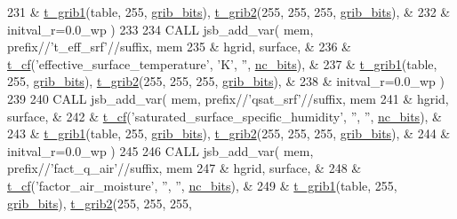 \begin{DoxyCode}
231       & \hyperlink{structmo__jsb__io_1_1t__grib1}{t\_grib1}(table, 255, \hyperlink{namespacemo__jsb__io_aade09fd070010f905e77497f041ce6c3}{grib\_bits}), \hyperlink{structmo__jsb__io_1_1t__grib2}{t\_grib2}(255, 255, 255, 
      \hyperlink{namespacemo__jsb__io_aade09fd070010f905e77497f041ce6c3}{grib\_bits}),   &
232       & initval\_r=0.0\_wp )
233 
234     \textcolor{keyword}{CALL }jsb\_add\_var( mem, prefix//\textcolor{stringliteral}{'t\_eff\_srf'}//suffix, mem%
235       & hgrid, surface,                                                      &
236       & \hyperlink{structmo__jsb__io_1_1t__cf}{t\_cf}(\textcolor{stringliteral}{'effective\_surface\_temperature'}, \textcolor{stringliteral}{'K'}, \textcolor{stringliteral}{''}, \hyperlink{namespacemo__jsb__io_a4bf2b656fa0a7acf938f0bfcad5870e3}{nc\_bits}),                &
237       & \hyperlink{structmo__jsb__io_1_1t__grib1}{t\_grib1}(table, 255, \hyperlink{namespacemo__jsb__io_aade09fd070010f905e77497f041ce6c3}{grib\_bits}), \hyperlink{structmo__jsb__io_1_1t__grib2}{t\_grib2}(255, 255, 255, 
      \hyperlink{namespacemo__jsb__io_aade09fd070010f905e77497f041ce6c3}{grib\_bits}),   &
238       & initval\_r=0.0\_wp )
239 
240     \textcolor{keyword}{CALL }jsb\_add\_var( mem, prefix//\textcolor{stringliteral}{'qsat\_srf'}//suffix, mem%
241       & hgrid, surface,                                                      &
242       & \hyperlink{structmo__jsb__io_1_1t__cf}{t\_cf}(\textcolor{stringliteral}{'saturated\_surface\_specific\_humidity'}, \textcolor{stringliteral}{''}, \textcolor{stringliteral}{''}, \hyperlink{namespacemo__jsb__io_a4bf2b656fa0a7acf938f0bfcad5870e3}{nc\_bits}),           &
243       & \hyperlink{structmo__jsb__io_1_1t__grib1}{t\_grib1}(table, 255, \hyperlink{namespacemo__jsb__io_aade09fd070010f905e77497f041ce6c3}{grib\_bits}), \hyperlink{structmo__jsb__io_1_1t__grib2}{t\_grib2}(255, 255, 255, 
      \hyperlink{namespacemo__jsb__io_aade09fd070010f905e77497f041ce6c3}{grib\_bits}),   &
244       & initval\_r=0.0\_wp )
245 
246     \textcolor{keyword}{CALL }jsb\_add\_var( mem, prefix//\textcolor{stringliteral}{'fact\_q\_air'}//suffix, mem%
247       & hgrid, surface,                                                      &
248       & \hyperlink{structmo__jsb__io_1_1t__cf}{t\_cf}(\textcolor{stringliteral}{'factor\_air\_moisture'}, \textcolor{stringliteral}{''}, \textcolor{stringliteral}{''}, \hyperlink{namespacemo__jsb__io_a4bf2b656fa0a7acf938f0bfcad5870e3}{nc\_bits}),                           &
249       & \hyperlink{structmo__jsb__io_1_1t__grib1}{t\_grib1}(table, 255, \hyperlink{namespacemo__jsb__io_aade09fd070010f905e77497f041ce6c3}{grib\_bits}), \hyperlink{structmo__jsb__io_1_1t__grib2}{t\_grib2}(255, 255, 255, 

\end{DoxyCode}
